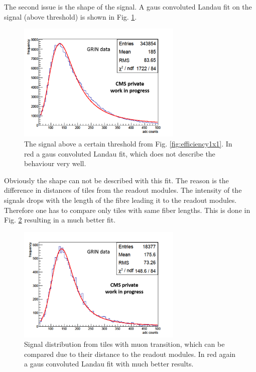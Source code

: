 			The second issue is the shape of the signal.
			A gaus convoluted Landau fit on the signal (above threshold) is shown in Fig. \ref{fig:langaus_bad}.
			\begin{figure}[htbp]
				\centering
				\includegraphics[width=0.70\textwidth]{Figures/erdogan/langaus_bad.png}
				\caption{The signal above a certain threshold from Fig. \ref{fig:efficiency1x1}. In red a gaus convoluted Landau fit, which does not describe the behaviour very well.}
				\label{fig:langaus_bad}
			\end{figure}
			Obviously the shape can not be described with this fit.
			The reason is the difference in distances of tiles from the readout modules.
			The intensity of the signals drops with the length of the fibre leading it to the readout modules.
			Therefore one has to compare only tiles with same fiber lengths.
			This is done in Fig. \ref{fig:langaus_good} resulting in a much better fit.
			\begin{figure}[htbp]
				\centering
				\includegraphics[width=0.70\textwidth]{Figures/erdogan/langaus_good.png}
				\caption{Signal distribution from tiles with muon transition, which can be compared due to their distance to the readout modules. In red again a gaus convoluted Landau fit with much better
				results.}
				\label{fig:langaus_good}
			\end{figure}
